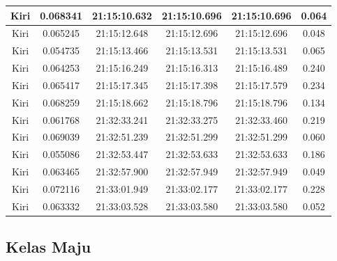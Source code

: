 \begin{longtable}{|c|c|c|c|c|c|}
      Kiri & 0.068341 & 21:15:10.632 & 21:15:10.696 & 21:15:10.696 & 0.064 \\ \hline
      Kiri & 0.065245 & 21:15:12.648 & 21:15:12.696 & 21:15:12.696 & 0.048 \\ \hline
      Kiri & 0.054735 & 21:15:13.466 & 21:15:13.531 & 21:15:13.531 & 0.065 \\ \hline
      Kiri & 0.064253 & 21:15:16.249 & 21:15:16.313 & 21:15:16.489 & 0.240 \\ \hline
      Kiri & 0.065417 & 21:15:17.345 & 21:15:17.398 & 21:15:17.579 & 0.234 \\ \hline
      Kiri & 0.068259 & 21:15:18.662 & 21:15:18.796 & 21:15:18.796 & 0.134 \\ \hline
      Kiri & 0.061768 & 21:32:33.241 & 21:32:33.275 & 21:32:33.460 & 0.219 \\ \hline
      Kiri & 0.069039 & 21:32:51.239 & 21:32:51.299 & 21:32:51.299 & 0.060 \\ \hline
      Kiri & 0.055086 & 21:32:53.447 & 21:32:53.633 & 21:32:53.633 & 0.186 \\ \hline
      Kiri & 0.063465 & 21:32:57.900 & 21:32:57.949 & 21:32:57.949 & 0.049 \\ \hline
      Kiri & 0.072116 & 21:33:01.949 & 21:33:02.177 & 21:33:02.177 & 0.228 \\ \hline
      Kiri & 0.063332 & 21:33:03.528 & 21:33:03.580 & 21:33:03.580 & 0.052 \\ \hline
\end{longtable}

\subsection{Kelas Maju}

